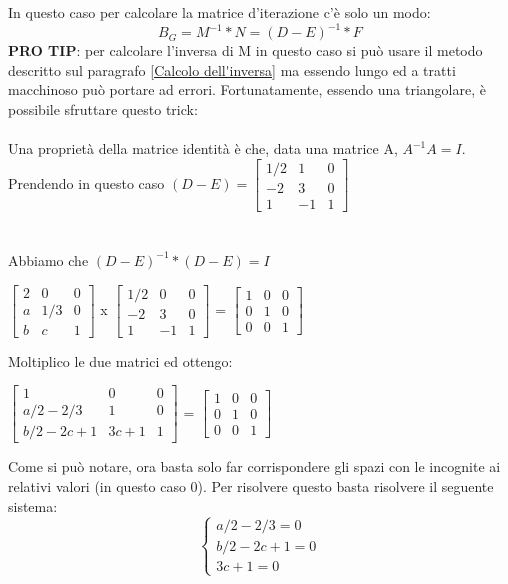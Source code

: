 In questo caso per calcolare la matrice d'iterazione c'è solo un modo: 
$$B_G = M^{-1}*N = (D-E)^{-1}*F $$
\noindent
\textbf{PRO TIP}: per calcolare l'inversa di M in questo caso si può usare il metodo descritto sul paragrafo \ref{Calcolo dell'inversa} ma essendo lungo ed a tratti macchinoso può portare ad errori. Fortunatamente, essendo una triangolare, è possibile sfruttare questo trick:
\\
\\
\noindent
Una proprietà della matrice identità è che, data una matrice A, $A^{-1}A = I$.
Prendendo in questo caso $(D-E) =
\begin{bmatrix}
1/2 & 1 & 0 \\
-2 & 3 & 0 \\
1 & -1 & 1 
\end{bmatrix}
$ 
\\ \\ \\
\noindent
Abbiamo che $(D-E)^{-1}*(D-E) = I$
\begin{center}
$
\begin{bmatrix}
2 & 0 & 0 \\
a & 1/3 & 0 \\
b & c & 1 
\end{bmatrix}
$
x
$
\begin{bmatrix}
1/2 & 0 & 0 \\
-2 & 3 & 0 \\
1 & -1 & 1 
\end{bmatrix}
$
=
$
\begin{bmatrix}
1 & 0 & 0 \\
0 & 1 & 0 \\
0 & 0 & 1
\end{bmatrix}
$
\end{center}
\noindent
Moltiplico le due matrici ed ottengo: \\
\begin{center}
$
\begin{bmatrix}
1 & 0 & 0 \\
a/2 - 2/3 & 1 & 0 \\
b/2 - 2c+1 & 3c+1 & 1 
\end{bmatrix}
$
=
$
\begin{bmatrix}
1 & 0 & 0 \\
0 & 1 & 0 \\
0 & 0 & 1
\end{bmatrix}
$
\end{center}
\noindent
Come si può notare, ora basta solo far corrispondere gli spazi con le incognite ai relativi valori (in questo caso 0). Per risolvere questo basta risolvere il seguente sistema:
$$\left\{
  \begin{array}{lr}
    a/2 -2/3 = 0 \\
    b/2 -2c+1 = 0 \\
    3c+1 = 0 
  \end{array}
\right.
$$

